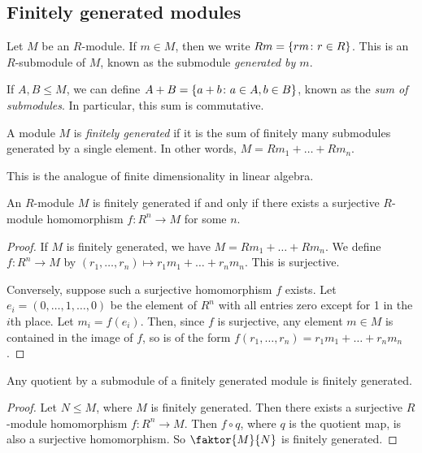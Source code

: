 \subsection{Finitely generated modules}
\begin{definition}
	Let \( M \) be an \( R \)-module.
	If \( m \in M \), then we write \( Rm = \qty{rm \colon r \in R} \).
	This is an \( R \)-submodule of \( M \), known as the submodule \textit{generated by \( m \)}.

	If \( A, B \leq M \), we can define \( A + B = \qty{a + b \colon a \in A, b \in B} \), known as the \textit{sum of submodules}.
	In particular, this sum is commutative.
\end{definition}
\begin{definition}
	A module \( M \) is \textit{finitely generated} if it is the sum of finitely many submodules generated by a single element.
	In other words, \( M = Rm_1 + \dots + Rm_n \).
\end{definition}
This is the analogue of finite dimensionality in linear algebra.
\begin{lemma}
	An \( R \)-module \( M \) is finitely generated if and only if there exists a surjective \( R \)-module homomorphism \( f \colon R^n \to M \) for some \( n \).
\end{lemma}
\begin{proof}
	If \( M \) is finitely generated, we have \( M = Rm_1 + \dots + Rm_n \).
	We define \( f \colon R^n \to M \) by \( (r_1, \dots, r_n) \mapsto r_1 m_1 + \dots + r_n m_n \).
	This is surjective.

	Conversely, suppose such a surjective homomorphism \( f \) exists.
	Let \( e_i = (0, \dots, 1, \dots, 0) \) be the element of \( R^n \) with all entries zero except for 1 in the \( i \)th place.
	Let \( m_i = f(e_i) \).
	Then, since \( f \) is surjective, any element \( m \in M \) is contained in the image of \( f \), so is of the form \( f(r_1, \dots, r_n) = r_1 m_1 + \dots + r_n m_n \).
\end{proof}
\begin{corollary}
	Any quotient by a submodule of a finitely generated module is finitely generated.
\end{corollary}
\begin{proof}
	Let \( N \leq M \), where \( M \) is finitely generated.
	Then there exists a surjective \( R \)-module homomorphism \( f \colon R^n \to M \).
	Then \( f \circ q \), where \( q \) is the quotient map, is also a surjective homomorphism.
	So \( \faktor{M}{N} \) is finitely generated.
\end{proof}
